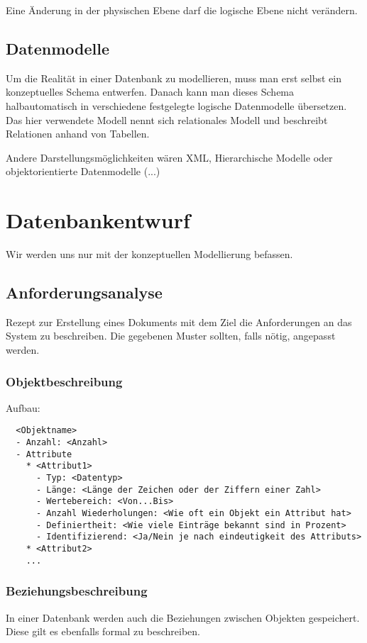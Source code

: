 \documentclass[a4paper, oneside]{book}
\begin{document}
  Eine Änderung in der physischen Ebene darf die logische Ebene nicht verändern.

  \section{Datenmodelle}
  Um die Realität in einer Datenbank zu modellieren, muss man erst selbst ein konzeptuelles Schema entwerfen.
  Danach kann man dieses Schema halbautomatisch in verschiedene festgelegte logische Datenmodelle übersetzen.
  Das hier verwendete Modell nennt sich relationales Modell und beschreibt Relationen anhand von Tabellen.

  Andere Darstellungsmöglichkeiten wären XML, Hierarchische Modelle oder objektorientierte Datenmodelle (...)

  \chapter{Datenbankentwurf}
  Wir werden uns nur mit der konzeptuellen Modellierung befassen.

  \section{Anforderungsanalyse}
  Rezept zur Erstellung eines Dokuments mit dem Ziel die Anforderungen an das System zu beschreiben.
  Die gegebenen Muster sollten, falls nötig, angepasst werden.

  \subsection{Objektbeschreibung}
  Aufbau:
  \begin{verbatim}
  <Objektname>
  - Anzahl: <Anzahl>
  - Attribute
    * <Attribut1>
      - Typ: <Datentyp>
      - Länge: <Länge der Zeichen oder der Ziffern einer Zahl>
      - Wertebereich: <Von...Bis>
      - Anzahl Wiederholungen: <Wie oft ein Objekt ein Attribut hat>
      - Definiertheit: <Wie viele Einträge bekannt sind in Prozent>
      - Identifizierend: <Ja/Nein je nach eindeutigkeit des Attributs>
    * <Attribut2>
    ...
  \end{verbatim}

  \subsection{Beziehungsbeschreibung}
  In einer Datenbank werden auch die Beziehungen zwischen Objekten gespeichert. Diese gilt es ebenfalls formal zu beschreiben.
\end{document}
